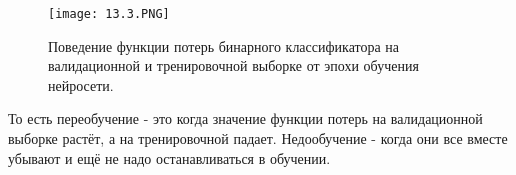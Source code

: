 \begin{figure}[h]
\centering
\texttt{[image: 13.3.PNG]}
\caption{Поведение функции потерь бинарного классификатора на валидационной и тренировочной выборке от эпохи обучения нейросети.}
\end{figure}

То есть переобучение - это когда значение функции потерь на валидационной выборке растёт, а на тренировочной падает. Недообучение - когда они все вместе убывают и ещё не надо останавливаться в обучении.

